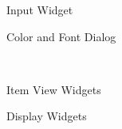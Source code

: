 \begin{minipage}{10cm}
	\small{Input Widget}
\end{minipage}
\begin{minipage}{5cm}
	\small{Color and Font Dialog}
\end{minipage}

	 \\
	
\begin{minipage}{8cm}
	\small{Item View Widgets}
\end{minipage}
\begin{minipage}{8cm}
	\small{Display Widgets}
\end{minipage}	
	
